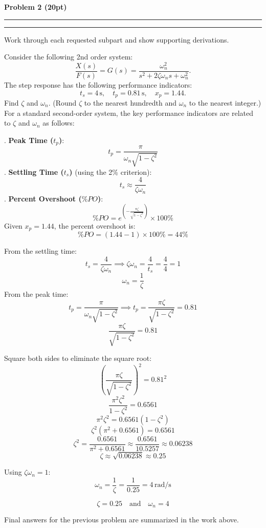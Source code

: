 \documentclass[12pt]{article}
\newcommand{\question}[1]{%
  \clearpage
  \vspace{0.5cm}
  {\noindent\normalsize \textbf{#1}}
  \vspace{0.2cm}
  \hrule
  \vspace{0.1cm}
  \hrule
  \vspace{0.3cm}
}
\begin{document}
\question{Problem 2 (20pt)}\label{quest:2}
\begin{stepbox}
Work through each requested subpart and show supporting derivations.
\end{stepbox}


Consider the following 2nd order system:
\[
\frac{X(s)}{F(s)} = G(s) = \frac{\omega_n^2}{s^2 + 2\zeta \omega_n s + \omega_n^2}.
\]
The step response has the following performance indicators: 
\[
t_s = 4 \, \text{s}, \quad t_p = 0.81 \, \text{s}, \quad x_p = 1.44.
\]
Find \( \zeta \) and \( \omega_n \). (Round \( \zeta \) to the nearest hundredth and \( \omega_n \) to the nearest integer.)
\newline\newline
For a standard second-order system, the key performance indicators are related to \( \zeta \) and \( \omega_n \) as follows:

. \textbf{Peak Time (\( t_p \))}:
   \[
   t_p = \frac{\pi}{\omega_n \sqrt{1 - \zeta^2}}
   \]
. \textbf{Settling Time (\( t_s \))} (using the 2\% criterion):
   \[
   t_s \approx \frac{4}{\zeta \omega_n}
   \]
. \textbf{Percent Overshoot (\( \%PO \))}:
   \[
   \%PO = e^{\left(-\frac{\pi \zeta}{\sqrt{1 - \zeta^2}}\right)} \times 100\%
   \]
   Given \( x_p = 1.44 \), the percent overshoot is:
   \[
   \%PO = (1.44 - 1) \times 100\% = 44\%
   \]

\noindent
From the settling time:
\[
t_s = \frac{4}{\zeta \omega_n} \implies \zeta \omega_n = \frac{4}{t_s} = \frac{4}{4} = 1
\]
\[
\omega_n = \frac{1}{\zeta}
\]
\noindent
From the peak time:
\[
t_p = \frac{\pi}{\omega_n \sqrt{1 - \zeta^2}} \implies t_p = \frac{\pi \zeta}{\sqrt{1 - \zeta^2}} = 0.81
\]
\[
\frac{\pi \zeta}{\sqrt{1 - \zeta^2}} = 0.81
\]

\noindent
Square both sides to eliminate the square root:
\[
\left(\frac{\pi \zeta}{\sqrt{1 - \zeta^2}}\right)^2 = 0.81^2
\]
\[
\frac{\pi^2 \zeta^2}{1 - \zeta^2} = 0.6561
\]
\[
\pi^2 \zeta^2 = 0.6561 (1 - \zeta^2)
\]
\[
\zeta^2 (\pi^2 + 0.6561) = 0.6561
\]
\[
\zeta^2 = \frac{0.6561}{\pi^2 + 0.6561} \approx \frac{0.6561}{10.5257} \approx 0.06238
\]
\[
\zeta \approx \sqrt{0.06238} \approx 0.25
\]

\noindent
Using \( \zeta \omega_n = 1 \):
\[
\omega_n = \frac{1}{\zeta} = \frac{1}{0.25} = 4 \, \text{rad/s}
\]

\[
\boxed{\,\zeta = 0.25 \quad \text{and} \quad \omega_n = 4\,}
\]



\newpage
\begin{resultsbox}
Final answers for the previous problem are summarized in the work above.
\end{resultsbox}
\end{document}
